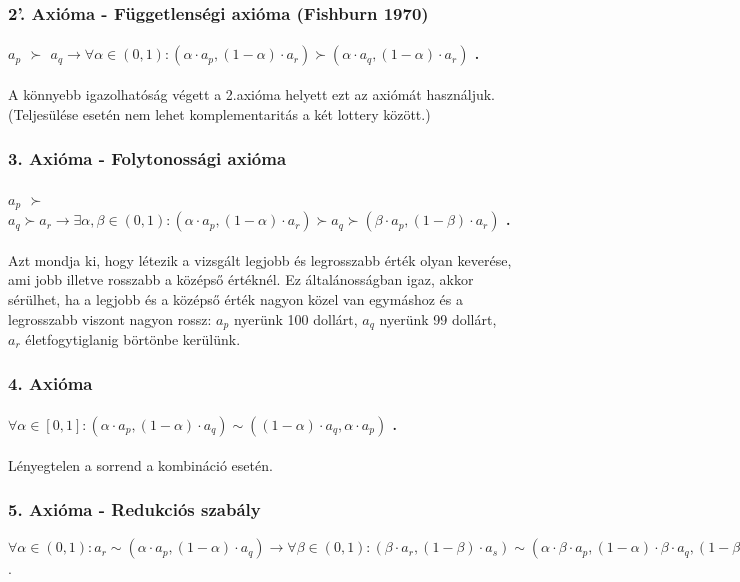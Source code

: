 \documentclass[a4paper,12pt]{article}
\begin{document}
\subsubsection{2'. Axióma - Függetlenségi axióma (Fishburn 1970)}
\paragraph{$a_p$  $\succ$ $a_q \rightarrow \forall \alpha \in (0,1): (\alpha\cdot a_p , (1-\alpha)\cdot a_r ) \succ (\alpha\cdot a_q , (1-\alpha)\cdot a_r )$ .} A könnyebb igazolhatóság végett a 2.axióma helyett ezt az axiómát használjuk. (Teljesülése esetén nem lehet komplementaritás a két lottery között.)

\subsubsection{3. Axióma - Folytonossági axióma}
\paragraph{$a_p$  $\succ$ $a_q \succ a_r \rightarrow \exists \alpha,\beta \in (0,1): (\alpha\cdot a_p , (1-\alpha)\cdot a_r )  \succ a_q \succ (\beta\cdot a_p , (1-\beta)\cdot a_r ) $ .} Azt mondja ki, hogy létezik a vizsgált legjobb és legrosszabb érték olyan keverése, ami jobb illetve rosszabb a középső értéknél. Ez általánosságban igaz, akkor sérülhet, ha a legjobb és a középső érték nagyon közel van egymáshoz és a legrosszabb viszont nagyon rossz: $a_p$ nyerünk 100 dollárt, $a_q$ nyerünk 99 dollárt, $a_r$ életfogytiglanig börtönbe kerülünk.

\subsubsection{4. Axióma}
\paragraph{$\forall  \alpha \in [0,1]: (\alpha\cdot a_p , (1-\alpha)\cdot a_q ) \sim ((1-\alpha)\cdot a_q ,\alpha\cdot a_p )$ . } Lényegtelen a sorrend a kombináció esetén.

\subsubsection{5. Axióma - Redukciós szabály}
$\forall  \alpha \in (0,1): a_r \sim (\alpha\cdot a_p , (1-\alpha)\cdot a_q) \rightarrow \forall  \beta \in (0,1): (\beta\cdot a_r, (1-\beta)\cdot a_s ) \sim (\alpha\cdot \beta\cdot a_p , (1-\alpha)\cdot \beta \cdot a_q, (1-\beta)\cdot a_s )$.
\end{document}
